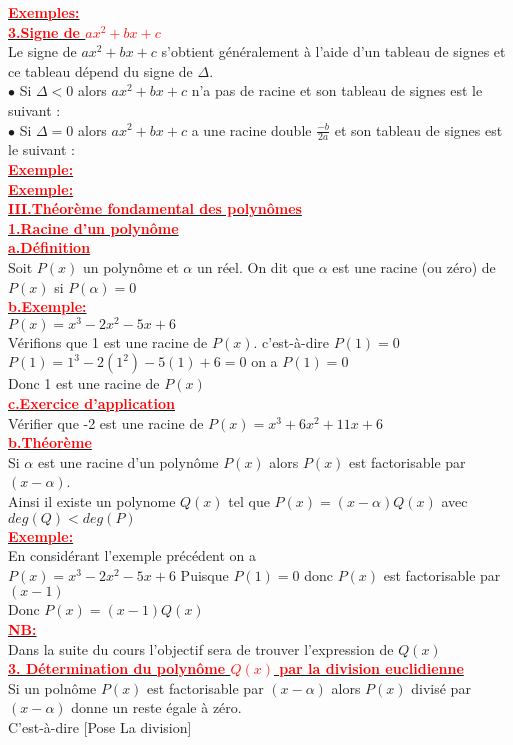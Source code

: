 \documentclass[12pt]{article}
\begin{document}
\underline{\textbf{\textcolor{red}{Exemples:}}}\\
\underline{\textbf{\textcolor{red}{3.Signe de $ax^{2}+bx+c$}}}\\
Le signe de $ax^{2}+bx+c$ s'obtient généralement à l'aide d'un tableau de signes et ce tableau dépend du signe de $\Delta$.\\
$\bullet$ Si $\Delta<0$ alors $ax^{2}+bx+c$ n'a pas de racine et son tableau de signes est le suivant :\\
$\bullet$ Si $\Delta=0$ alors $ax^{2}+bx+c$ a une racine double $\frac{-b}{2a}$ et son tableau de signes est le suivant :\\
\underline{\textbf{\textcolor{red}{Exemple:}}}\\
\underline{\textbf{\textcolor{red}{Exemple:}}}\\
\underline{\textbf{\textcolor{red}{III.Théorème fondamental des polynômes}}}\\
\underline{\textbf{\textcolor{red}{1.Racine d'un polynôme}}}\\
\underline{\textbf{\textcolor{red}{a.Définition}}}\\
Soit $P(x)$ un polynôme et $\alpha$ un réel. 
On dit que $\alpha$ est une racine (ou zéro) de $P(x)$ si $P(\alpha)=0$\\
\underline{\textbf{\textcolor{red}{b.Exemple:}}}\\
$P(x)=x^{3}-2x^{2}-5x+6$\\
Vérifions que 1 est une racine de $P(x)$. c'est-à-dire $P(1)=0$\\
$P(1)=1^{3}-2(1^{2})-5(1)+6=0$ on a $P(1)=0$ \\Donc 1 est une racine de $P(x)$\\
\underline{\textbf{\textcolor{red}{c.Exercice d'application}}}\\
Vérifier que -2 est une racine de $P(x)=x^{3}+6x^{2}+11x+6$\\
\underline{\textbf{\textcolor{red}{b.Théorème}}}\\
Si $\alpha$ est une racine d'un polynôme $P(x)$ alors $P(x)$ est factorisable par $(x-\alpha)$.\\
Ainsi il existe un polynome $Q(x)$ tel que $P(x)=(x-\alpha)Q(x)$ avec\\ $deg(Q)<deg(P)$\\
\underline{\textbf{\textcolor{red}{Exemple:}}}\\
En considérant l'exemple précédent on a\\
$P(x)=x^{3}-2x^{2}-5x+6$ Puisque $P(1)=0$ donc $P(x)$ est factorisable par $(x-1)$\\
Donc $P(x)=(x-1)Q(x)$ \\
\underline{\textbf{\textcolor{red}{NB:}}}\\
Dans la suite du cours l'objectif sera de trouver l'expression de $Q(x)$\\
\underline{\textbf{\textcolor{red}{3. Détermination du polynôme $Q(x)$ par la division euclidienne}}}\\
Si un polnôme $P(x)$ est factorisable par $(x-\alpha)$ alors $P(x)$ divisé par $(x-\alpha)$ donne un reste égale à zéro.\\
C'est-à-dire [Pose La division]\\
\end{document}
